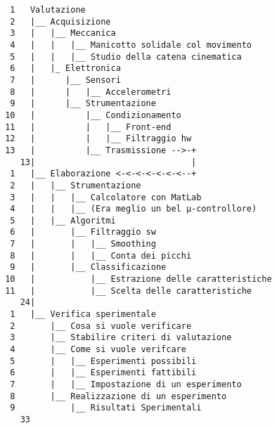 \eject
\begin{framed} \begin{verbatim}
  1   Valutazione
  2   |__ Acquisizione
  3   |   |__ Meccanica
  4   |   |   |__ Manicotto solidale col movimento
  5   |   |   |__ Studio della catena cinematica
  6   |   |_ Elettronica
  7   |      |__ Sensori
  8   |      |   |__ Accelerometri
  9   |      |__ Strumentazione
 10   |          |__ Condizionamento
 11   |          |   |__ Front-end
 12   |          |   |__ Filtraggio hw
 13   |          |__ Trasmissione -->-+
    13|                               |
  1   |__ Elaborazione <-<-<-<-<-<-<--+
  2   |   |__ Strumentazione
  3   |   |   |__ Calcolatore con MatLab
  4   |   |   |__ (Era meglio un bel µ-controllore)
  5   |   |__ Algoritmi
  6   |       |__ Filtraggio sw
  7   |       |   |__ Smoothing
  8   |       |   |__ Conta dei picchi
  9   |       |__ Classificazione
 10   |           |__ Estrazione delle caratteristiche
 11   |           |__ Scelta delle caratteristiche
    24|
  1   |__ Verifica sperimentale
  2       |__ Cosa si vuole verificare
  3       |__ Stabilire criteri di valutazione
  4       |__ Come si vuole verifcare
  5       |   |__ Esperimenti possibili
  6       |   |__ Esperimenti fattibili
  7       |   |__ Impostazione di un esperimento
  8       |__ Realizzazione di un esperimento
  9           |__ Risultati Sperimentali
    33
\end{verbatim} \end{framed}